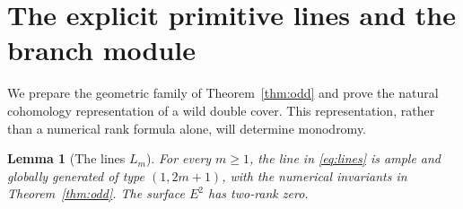 \documentclass[11pt]{article}
\newtheorem{lemma}[theorem]{Lemma}
\theoremstyle{remark}\newtheorem{remark}[theorem]{Remark}
\begin{document}
\section{The explicit primitive lines and the branch module}\label{sec:double}

We prepare the geometric family of Theorem~\ref{thm:odd} and prove the natural cohomology representation of a wild double cover. This representation, rather than a numerical rank formula alone, will determine monodromy.

\begin{lemma}[The lines $L_m$]\label{lem:explicit-lines}
For every $m\ge1$, the line in \eqref{eq:lines} is ample and globally generated of type $(1,2m+1)$, with the numerical invariants in Theorem~\ref{thm:odd}. The surface $E^2$ has two-rank zero.
\end{lemma}
\end{document}
